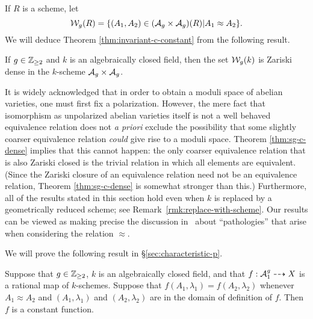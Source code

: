 \documentclass{amsart}
\begin{document}
If $R$ is a scheme, let
$$
\mathcal{W}_g(R) = \{(A_1,A_2) \in (\mathcal{A}_g \times \mathcal{A}_g)(R) | A_1 \approx A_2\}.
$$
We will deduce Theorem \ref{thm:invariant-c-constant} from the following result.

\begin{theorem}\label{thm:sg-c-dense}
  If $g\in\mathbb{Z}_{\ge 2}$ and $k$ is an algebraically closed field, then the set $\mathcal{W}_g(k)$ is Zariski dense in the $k$-scheme $\mathcal{A}_g \times \mathcal{A}_g$.
\end{theorem}

It is widely acknowledged that in order to obtain a moduli space of abelian varieties, one must first fix a polarization.  However, the mere fact that isomorphism as unpolarized abelian varieties itself is not a well behaved equivalence relation does not {\it a priori} exclude the possibility that some slightly coarser equivalence relation {\em could} give rise to a moduli space. Theorem \ref{thm:sg-c-dense} implies that this cannot happen: the only coarser equivalence relation that is also Zariski closed is the trivial relation in which all elements are equivalent.
(Since the Zariski closure of an equivalence relation need not be an equivalence relation, Theorem \ref{thm:sg-c-dense} is somewhat stronger than this.) Furthermore, all of the results stated in this section hold even when $k$ is replaced by a geometrically reduced scheme; see Remark~\ref{rmk:replace-with-scheme}.
Our results can be viewed as making precise the discussion in~\cite[p. 97]{git} about  ``pathologies'' that arise when considering the relation $\approx$.

We will prove the following result in \S\ref{sec:characteristic-p}.
\begin{theorem}\label{thm:arbit-char}
  Suppose that $g\in\mathbb{Z}_{\ge 2}$, $k$ is an algebraically closed field, and that $f: \mathcal{A}_1^g \dashrightarrow X$ is a rational map of $k$-schemes. Suppose that $f(A_1,\lambda_1) = f(A_2,\lambda_2)$ whenever $A_1 \approx A_2$ and $(A_1,\lambda_1)$ and $(A_2,\lambda_2)$ are in the domain of definition of $f$. Then $f$ is a constant function.
\end{theorem}

\end{document}

